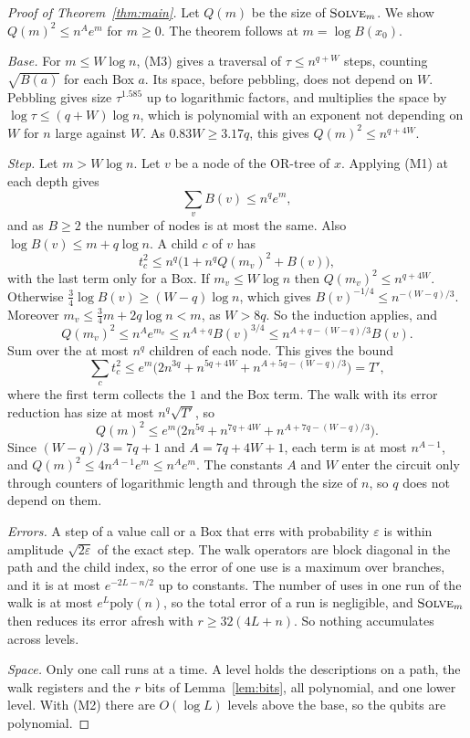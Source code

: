 \documentclass[11pt]{article}
\theoremstyle{definition}
\theoremstyle{remark}
\newcommand{\Solve}{\textsc{Solve}}
\newcommand{\poly}{\mathrm{poly}}
\begin{document}
\begin{proof}[Proof of Theorem~\ref{thm:main}]
Let $Q(m)$ be the size of $\Solve_m$. We show $Q(m)^2\le n^Ae^m$ for $m\ge0$. The theorem follows at $m=\log B(x_0)$.

\emph{Base.} For $m\le W\log n$, (M3) gives a traversal of $\tau\le n^{q+W}$ steps, counting $\sqrt{B(a)}$ for each Box $a$. Its space, before pebbling, does not depend on $W$. Pebbling gives size $\tau^{1.585}$ up to logarithmic factors, and multiplies the space by $\log\tau\le(q+W)\log n$, which is polynomial with an exponent not depending on $W$ for $n$ large against $W$. As $0.83W\ge3.17q$, this gives $Q(m)^2\le n^{q+4W}$.

\emph{Step.} Let $m>W\log n$. Let $v$ be a node of the OR-tree of $x$. Applying (M1) at each depth gives
\[
\sum_vB(v)\le n^qe^m,
\]
and as $B\ge2$ the number of nodes is at most the same. Also $\log B(v)\le m+q\log n$. A child $c$ of $v$ has
\[
t_c^2\le n^q\bigl(1+n^qQ(m_v)^2+B(v)\bigr),
\]
with the last term only for a Box. If $m_v\le W\log n$ then $Q(m_v)^2\le n^{q+4W}$. Otherwise $\frac34\log B(v)\ge(W-q)\log n$, which gives $B(v)^{-1/4}\le n^{-(W-q)/3}$. Moreover $m_v\le\frac34m+2q\log n<m$, as $W>8q$. So the induction applies, and
\[
Q(m_v)^2\le n^Ae^{m_v}\le n^{A+q}B(v)^{3/4}\le n^{A+q-(W-q)/3}B(v).
\]
Sum over the at most $n^q$ children of each node. This gives the bound
\[
\sum_ct_c^2\le e^m\bigl(2n^{3q}+n^{5q+4W}+n^{A+5q-(W-q)/3}\bigr)=T',
\]
where the first term collects the $1$ and the Box term. The walk with its error reduction has size at most $n^q\sqrt{T'}$, so
\[
Q(m)^2\le e^m\bigl(2n^{5q}+n^{7q+4W}+n^{A+7q-(W-q)/3}\bigr).
\]
Since $(W-q)/3=7q+1$ and $A=7q+4W+1$, each term is at most $n^{A-1}$, and $Q(m)^2\le4n^{A-1}e^m\le n^Ae^m$. The constants $A$ and $W$ enter the circuit only through counters of logarithmic length and through the size of $n$, so $q$ does not depend on them.

\emph{Errors.} A step of a value call or a Box that errs with probability $\varepsilon$ is within amplitude $\sqrt{2\varepsilon}$ of the exact step. The walk operators are block diagonal in the path and the child index, so the error of one use is a maximum over branches, and it is at most $e^{-2L-n/2}$ up to constants. The number of uses in one run of the walk is at most $e^L\poly(n)$, so the total error of a run is negligible, and $\Solve_m$ then reduces its error afresh with $r\ge32(4L+n)$. So nothing accumulates across levels.

\emph{Space.} Only one call runs at a time. A level holds the descriptions on a path, the walk registers and the $r$ bits of Lemma~\ref{lem:bits}, all polynomial, and one lower level. With (M2) there are $O(\log L)$ levels above the base, so the qubits are polynomial.
\end{proof}
\end{document}
